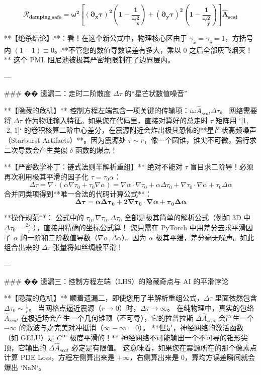 \documentclass[12pt]{article}
\begin{document}
{$$ \mathbf{\mathcal{R}_{damping\_safe} = \omega^2 \left[ (\partial_x \tau)^2 \left( 1 - \frac{1}{\gamma_x^2} \right) + (\partial_y \tau)^2 \left( 1 - \frac{1}{\gamma_y^2} \right) \right] \hat{A}_{scat}} $$

**【绝杀结论】**：看！在这个新公式中，物理核心区由于 $\gamma_x = \gamma_y = 1$，方括号内 $(1 - 1) \equiv 0$。**不管您的数值导数误差有多大，乘以 0 之后全部灰飞烟灭！** 这个 PML 阻尼池被极其严密地限制在了边界层内。

---

### �� 遗漏二：走时二阶散度 $\Delta \tau$ 的“星芒状数值噪音”

**【隐藏的危机】**
控制方程左端包含一项关键的传输项：$i \omega \hat{A}_{scat} \Delta \tau$。
网络需要将 $\Delta \tau$ 作为物理输入特征。如果您在代码里，直接对算好的总走时 $\tau$ 矩阵用 `[1, -2, 1]` 的卷积核算二阶中心差分，在震源附近会炸出极其恐怖的**星芒状高频噪声（Starburst Artifacts）**。因为震源处 $\tau \sim r$，像一个圆锥，锥尖不可微，强行求二次导数会产生类似 $\delta$ 函数的爆点！

**【严密数学补丁：链式法则半解析重组】**
绝对不能对 $\tau$ 盲目求二阶导！必须再次利用极其平滑的因子化 $\tau = \tau_0 \alpha$：
$$ \Delta \tau = \nabla \cdot (\alpha \nabla \tau_0 + \tau_0 \nabla \alpha) = \nabla \alpha \cdot \nabla \tau_0 + \alpha \Delta \tau_0 + \nabla \tau_0 \cdot \nabla \alpha + \tau_0 \Delta \alpha $$
合并同类项得到**唯一合法的代码计算公式**：
$$ \mathbf{\Delta \tau = \alpha \Delta \tau_0 + 2 \nabla \tau_0 \cdot \nabla \alpha + \tau_0 \Delta \alpha} $$

**操作规范**：
公式中的 $\tau_0, \nabla \tau_0, \Delta \tau_0$ 全部是极其简单的解析公式（例如 3D 中 $\Delta \tau_0 = \frac{2s_0}{r}$），直接用精确的坐标公式算！
您只需在 PyTorch 中用差分去求平滑因子 $\alpha$ 的一阶和二阶数值导数（$\nabla \alpha, \Delta \alpha$）。因为 $\alpha$ 极其平缓，差分毫无噪声。如此组合出来的 $\Delta \tau$ 张量将如丝绸般平滑！

---

### �� 遗漏三：控制方程左端（LHS）的隐藏奇点与 AI 的平滑悖论

**【隐藏的危机】**
顺着遗漏二，即使您用了半解析重组公式，$\Delta \tau$ 里面依然包含 $\Delta \tau_0 \sim \frac{1}{r}$。
当网格点逼近震源（$r \to 0$）时，$\Delta \tau \to \infty$。
在纯物理中，真实的包络 $\hat{A}_{scat}$ 在极近场会产生一个几何锥顶（不可导），它的拉普拉斯 $\Delta \hat{A}_{scat}$ 会产生一个 $-\infty$ 的激波与之完美对冲抵消（$\infty - \infty = 0$）。
**但是，神经网络的激活函数（如 GELU）是 $C^\infty$ 极度平滑的！** 神经网络不可能输出一个不可导的锥形尖顶，它输出的 $\Delta \hat{A}_{scat}$ 必定是有限值。
这意味着，如果您在震源所在的那个像素点计算 PDE Loss，方程左侧算出来是 $+\infty$，右侧算出来是 $0$，算均方误差瞬间就会爆出 `NaN`。

}
\end{document}
